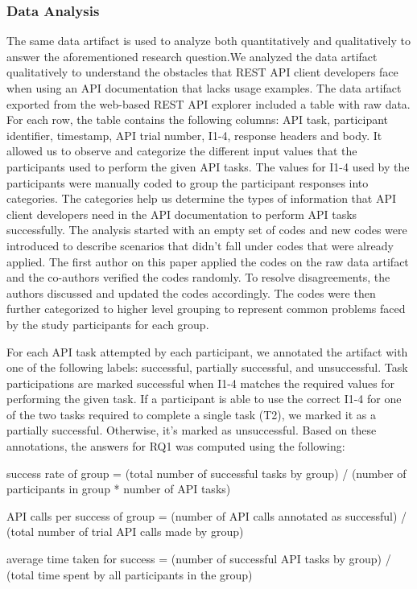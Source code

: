 \documentclass[conference]{IEEEtran}
\begin{document}
\subsubsection{Data Analysis}
The same data artifact is used to analyze both quantitatively and qualitatively to answer the aforementioned research question.We analyzed the data artifact qualitatively to understand the obstacles that REST API client developers face when using an API documentation that lacks usage examples. The data artifact exported from the web-based REST API explorer included a table with raw data. For each row, the table contains the following columns: API task, participant identifier, timestamp, API trial number, I1-4, response headers and body. It allowed us to observe and categorize the different input values that the participants used to perform the given API tasks. The values for I1-4 used by the participants were manually coded to group the participant responses into categories. The categories help us determine the types of information that API client developers need in the API documentation to perform API tasks successfully. The analysis started with an empty set of codes and new codes were introduced to describe scenarios that didn't fall under  codes that were already applied. The first author on this paper applied the codes on the raw data artifact and the co-authors verified the codes randomly. To resolve disagreements, the authors discussed and updated the codes accordingly. The codes were then further categorized to higher level grouping to represent common problems faced by the study participants for each group.

For each API task attempted by each participant, we annotated the artifact with one of the following labels: successful, partially successful, and unsuccessful. Task participations are marked successful when I1-4 matches the required values for performing the given task. If a participant is able to use the correct I1-4 for one of the two tasks required to complete a single task (T2), we marked it as a partially successful. Otherwise, it's marked as unsuccessful. Based on these annotations, the answers for RQ1 was computed using the following:


success rate of group = (total number of successful tasks by group) / (number of participants in group * number of API tasks)

API calls per success of group = (number of API calls annotated as successful) / (total number of trial API calls made by group)

average time taken for success = (number of successful API tasks by group) / (total time spent by all participants in the group)
\end{document}
